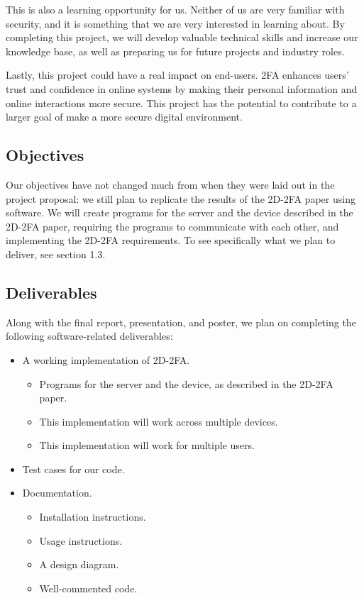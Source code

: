 \documentclass{article} %
\begin{document}
This is also a learning opportunity for us. Neither of us are very
familiar with security, and it is something that we are very interested
in learning about. By completing this project, we will develop valuable
technical skills and increase our knowledge base, as well as preparing
us for future projects and industry roles.

Lastly, this project could have a real impact on end-users. 2FA enhances
users' trust and confidence in online systems by making their personal
information and online interactions more secure. This project has the
potential to contribute to a larger goal of make a more secure digital
environment. 

\subsection{Objectives}

Our objectives have not changed much from when they were laid out in the
project proposal: we still plan to replicate the results of the 2D-2FA
paper using software. We will create programs for the server and the
device described in the 2D-2FA paper, requiring the programs to
communicate with each other, and implementing the 2D-2FA requirements.
To see specifically what we plan to deliver, see section 1.3.

\subsection{Deliverables}

Along with the final report, presentation, and poster, we plan on
completing the following software-related deliverables:
\begin{itemize}
    \item A working implementation of 2D-2FA.

    \begin{itemize}
        \item Programs for the server and the device, as described in
        the 2D-2FA paper. 

        \item This implementation will work across multiple devices.

        \item This implementation will work for multiple users.
    \end{itemize}

    \item Test cases for our code.

    \item Documentation.

    \begin{itemize}
        \item Installation instructions.

        \item Usage instructions.

        \item A design diagram.

        \item Well-commented code.
    \end{itemize}
\end{itemize}
\end{document}
